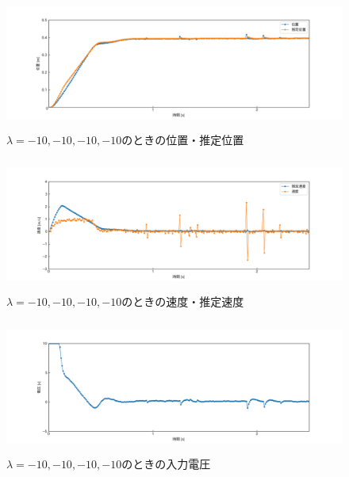 \documentclass[12pt]{jsarticle}
\begin{document}
\begin{figure}[H]
  \begin{center}
    \includegraphics[clip,width=13.0cm, height=4.4cm]{../img/Exp14-1.png}
    \caption{$\lambda=-10, -10, -10, -10$のときの位置・推定位置}
    \label{Exp14-1}
  \end{center}
\end{figure}
\begin{figure}[H]
  \begin{center}
    \includegraphics[clip,width=13.0cm, height=4.4cm]{../img/Exp14-2.png}
    \caption{$\lambda=-10, -10, -10, -10$のときの速度・推定速度}
    \label{Exp14-2}
  \end{center}
\end{figure}
\begin{figure}[H]
  \begin{center}
    \includegraphics[clip,width=13.0cm, height=4.4cm]{../img/Exp14-3.png}
    \caption{$\lambda=-10, -10, -10, -10$のときの入力電圧}
    \label{Exp14-3}
  \end{center}
\end{figure}
\end{document}
